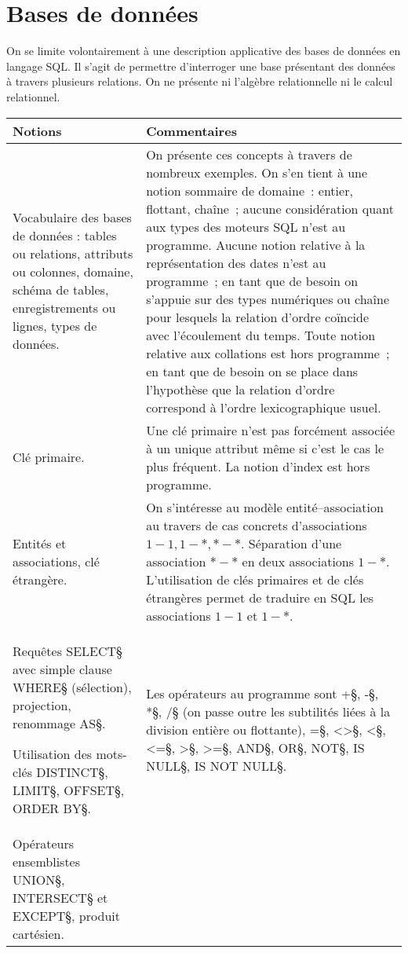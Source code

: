 \section{Bases de données \semDeux}

On se limite volontairement à une description applicative des bases
de données en langage SQL. Il s'agit de permettre d'interroger une base présentant des données
à travers plusieurs relations. On ne présente ni l'algèbre relationnelle ni le
calcul relationnel.

\noindent
\begin{longtable}{|p{\lnotion}|p{\comment}|}
    \hline
    \textbf{Notions} & \textbf{Commentaires} \\ \hline \hline
    Vocabulaire des bases de données : tables ou relations, attributs ou colonnes, domaine, schéma de tables, enregistrements ou lignes, types de données.&
    On présente ces concepts à travers de nombreux exemples. On s'en tient à une notion sommaire de domaine~: entier, flottant, chaîne~; aucune considération quant aux types des moteurs SQL n'est au programme. Aucune notion relative à la représentation des dates n'est au programme~; en tant que de besoin on s'appuie sur des types numériques ou chaîne pour lesquels la relation d'ordre coïncide avec l'écoulement du temps. Toute notion relative aux collations est hors programme~; en tant que de besoin on se place dans l'hypothèse que la relation d'ordre correspond à l'ordre lexicographique usuel.
 \\ \hline

    Clé primaire. & Une clé primaire n'est pas forcément associée à un unique
    attribut même si c'est le cas le plus fréquent. La notion d'index est hors
    programme.
 \\ \hline
    Entités et associations, clé étrangère. &
    On s'intéresse au modèle entité--association au travers de cas
    concrets d'associations $1-1, 1-*, *-*$.
    Séparation d'une association $*-*$ en deux associations $1-*$. L'utilisation
    de clés primaires et de clés étrangères permet de traduire en SQL les
    associations $1-1$ et $1-*$.
\\ \hline

    Requêtes \§SELECT§ avec simple clause \§WHERE§ (sélection), projection, renommage \§AS§.

    Utilisation des mots-clés \§DISTINCT§, \§LIMIT§, \§OFFSET§, \§ORDER BY§. & Les opérateurs au programme sont \§+§, \§-§, \§*§, \§/§ (on passe outre les subtilités liées à la division entière ou flottante), \§=§, \§<>§, \§<§, \§<=§, \§>§, \§>=§, \§AND§, \§OR§, \§NOT§, \§IS NULL§, \§IS NOT NULL§.
\\
    Opérateurs ensemblistes \§UNION§, \§INTERSECT§ et \§EXCEPT§, produit cartésien. &
\\ \hline


\end{longtable}
